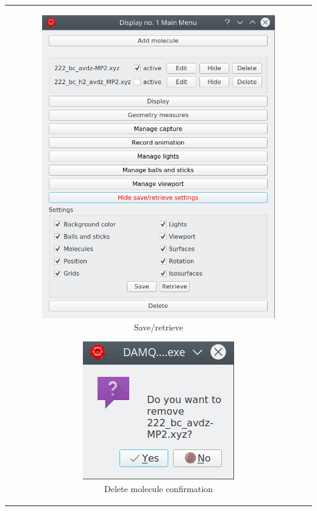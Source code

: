 \documentclass[10pt]{article}
\begin{document}
\begin{tabular}{lcr}
\begin{minipage}{.5\linewidth}
\end{minipage}
&
\begin{minipage}{.5\linewidth}

\begin{figure}[H]
    \begin{center}
        \includegraphics[width=0.5\linewidth]{damqt320_3D_settings.png}
    \end{center}
    \vspace*{5mm}
    \caption{Save/retrieve \label{fig:4_12}}
\end{figure}

\begin{figure}[H]
    \begin{center}
        \includegraphics[width=0.4\linewidth]{damqt320_molecule_delete.png}
    \end{center}
    \caption{Delete molecule confirmation \label{fig:4_13_1}}
\end{figure}
\end{minipage}
\end{tabular}
\end{document}
